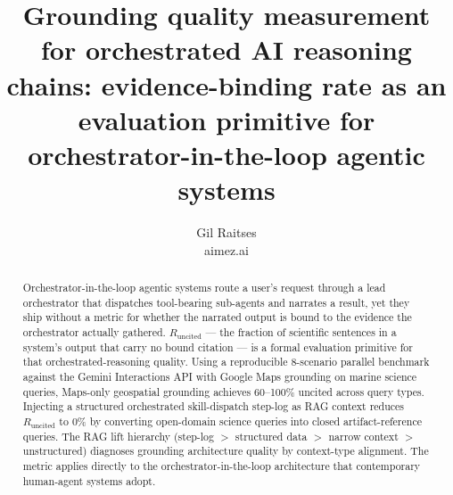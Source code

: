 \documentclass[10pt,twocolumn]{article}
\title{Grounding quality measurement for orchestrated AI reasoning chains:
       evidence-binding rate as an evaluation primitive for orchestrator-in-the-loop agentic systems}
\author{Gil Raitses \\ \small aimez.ai}
\date{}
\newcommand{\Runcited}{R_{\mathrm{uncited}}}
\begin{document}
\maketitle

\fontsize{8.45}{9.25}\selectfont

\begin{abstract}
Orchestrator-in-the-loop agentic systems route a user's request through a lead orchestrator that
dispatches tool-bearing sub-agents and narrates a result, yet they ship without a metric for
whether the narrated output is bound to the evidence the orchestrator actually gathered.
$\Runcited$ --- the fraction of scientific sentences in a system's output that carry no bound
citation --- is a formal evaluation primitive for that orchestrated-reasoning quality. Using a
reproducible 8-scenario parallel benchmark against the Gemini Interactions API with Google Maps
grounding on marine science queries, Maps-only geospatial grounding achieves 60--100\% uncited
across query types. Injecting a structured orchestrated skill-dispatch step-log as RAG context reduces $\Runcited$ to 0\% by converting open-domain science queries into closed artifact-reference queries. The RAG lift hierarchy (step-log $>$ structured data $>$ narrow context $>$ unstructured) diagnoses grounding architecture quality by context-type alignment. The metric
applies directly to the orchestrator-in-the-loop architecture that contemporary human-agent
systems adopt.
\end{abstract}








\clearpage
\printbibliography[title={References}]

\appendix

\end{document}
